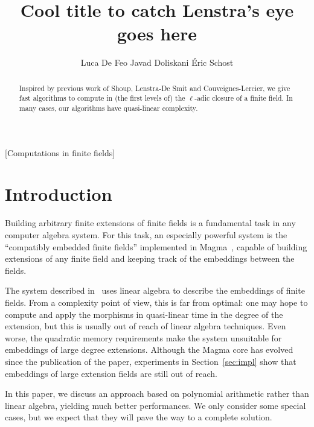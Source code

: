 \documentclass{sig-alternate}
\begin{document}
\title{Cool title to catch Lenstra's eye goes here}
\author{
  \alignauthor Luca De Feo
  \alignauthor Javad Doliskani
  \alignauthor \'Eric Schost
}

\maketitle
\begin{abstract}
  Inspired by previous work of Shoup, Lenstra-De Smit and
  Couveignes-Lercier, we give fast algorithms to compute in (the first
  levels of) the $\ell$-adic closure of a finite field. In many cases,
  our algorithms have quasi-linear complexity.
\end{abstract}
[Computations in finite fields]


\section{Introduction}
\label{sec:intro}

Building arbitrary finite extensions of finite fields is a fundamental
task in any computer algebra system. For this task, an especially
powerful system is the ``compatibly embedded finite fields''
implemented in Magma~\cite{MAGMA,bosma+cannon+steel97}, capable of
building extensions of any finite field and keeping track of the
embeddings between the fields.

The system described in~\cite{bosma+cannon+steel97} uses linear
algebra to describe the embeddings of finite fields. From a complexity
point of view, this is far from optimal: one may hope to compute and
apply the morphisms in quasi-linear time in the degree of the
extension, but this is usually out of reach of linear algebra
techniques. Even worse, the quadratic memory requirements make the
system unsuitable for embeddings of large degree extensions. Although
the Magma core has evolved since the publication of the paper,
experiments in Section~\ref{sec:impl} show that embeddings of large
extension fields are still out of reach.

In this paper, we discuss an approach based on polynomial arithmetic
rather than linear algebra, yielding much better performances. We only
consider some special cases, but we expect that they will pave the way
to a complete solution.
\end{document}
